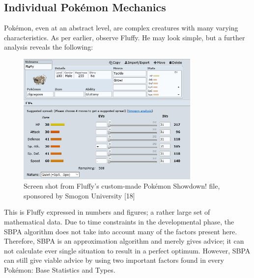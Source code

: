 \documentclass{article}
\begin{document}
\subsection{Individual Pok\'emon Mechanics}
Pok\'emon, even at an abstract level, are complex creatures with many varying characteristics. As per earlier, observe Fluffy. He may look simple, but a further analysis reveals the following:
\begin{figure}[H]
	\includegraphics[width=0.8\textwidth]{fluffyfile.png}
	\centering
	\caption{Screen shot from Fluffy's custom-made Pok\'emon Showdown! file, sponsored by Smogon University [18]}\label{FluffyFile}
\end{figure}
This is Fluffy expressed in numbers and figures; a rather large set of mathematical data. Due to time constraints in the developmental phase, the SBPA algorithm does not take into account many of the factors present here. Therefore, SBPA is an approximation algorithm and merely gives advice; it can not calculate ever single situation to result in a perfect optimum. However, SBPA can still give viable advice by using two important factors found in every Pok\'emon: Base Statistics and Types.
\end{document}
